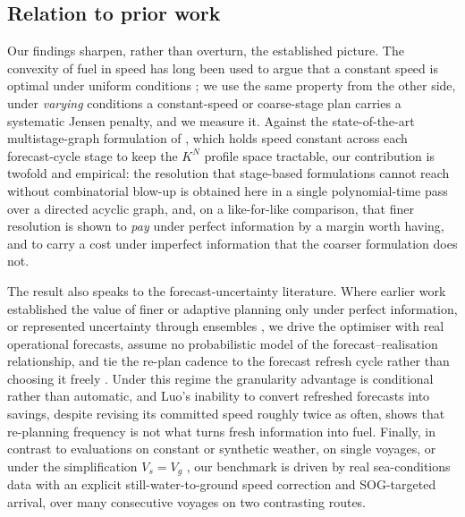 \documentclass[review,authoryear]{elsarticle}
\begin{document}
\subsection{Relation to prior work}
Our findings sharpen, rather than overturn, the established picture. The convexity of fuel in speed has
long been used to argue that a constant speed is optimal under uniform conditions \citep{Ronen2011,
Hvattum2013}; we use the same property from the other side, under \emph{varying} conditions a
constant-speed or coarse-stage plan carries a systematic Jensen penalty, and we measure it. Against
the state-of-the-art multistage-graph formulation of \citet{luo2024}, which holds speed constant across
each forecast-cycle stage to keep the $K^{N}$ profile space tractable, our contribution is twofold and
empirical: the resolution that stage-based formulations cannot reach without combinatorial blow-up is
obtained here in a single polynomial-time pass over a directed acyclic graph, and, on a
like-for-like comparison, that finer resolution is shown to \emph{pay} under perfect information by a
margin worth having, and to carry a cost under imperfect information that the coarser formulation does
not.

The result also speaks to the forecast-uncertainty literature. Where earlier work established the value
of finer or adaptive planning only under perfect information, or represented uncertainty through
ensembles \citep{Vettor2022, Luo2023}, we drive the optimiser with real operational forecasts, assume
no probabilistic model of the forecast--realisation relationship, and tie the re-plan cadence to the
forecast refresh cycle rather than choosing it freely \citep{Tzortzis2021, Zheng2023}. Under this
regime the granularity advantage is conditional rather than automatic, and Luo's inability to convert
refreshed forecasts into savings, despite revising its committed speed roughly twice as often, shows
that re-planning frequency is not what turns fresh information into fuel. Finally, in contrast to evaluations on constant or
synthetic weather, on single voyages, or under the simplification $V_s\!=\!V_g$ \citep{Cariou2011}, our
benchmark is driven by real sea-conditions data with an explicit still-water-to-ground speed correction
and SOG-targeted arrival, over many consecutive voyages on two contrasting routes.
\end{document}
